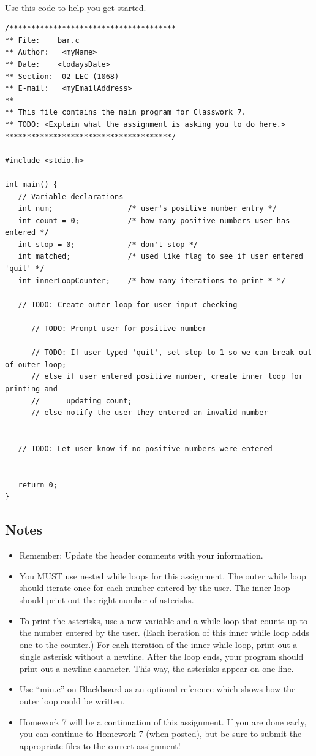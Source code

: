 \documentclass[letter,11pt]{article}
\begin{document}
\paragraph{}Use this code to help you get started.
\begin{verbatim}
/**************************************
** File:    bar.c
** Author:   <myName>
** Date:    <todaysDate>
** Section:  02-LEC (1068)
** E-mail:   <myEmailAddress>
**
** This file contains the main program for Classwork 7.
** TODO: <Explain what the assignment is asking you to do here.>
**************************************/

#include <stdio.h>

int main() {
   // Variable declarations
   int num;                 /* user's positive number entry */
   int count = 0;           /* how many positive numbers user has entered */
   int stop = 0;            /* don't stop */
   int matched;             /* used like flag to see if user entered 'quit' */
   int innerLoopCounter;    /* how many iterations to print * */

   // TODO: Create outer loop for user input checking

      // TODO: Prompt user for positive number

      // TODO: If user typed 'quit', set stop to 1 so we can break out of outer loop;
      // else if user entered positive number, create inner loop for printing and 
      //      updating count;
      // else notify the user they entered an invalid number


   // TODO: Let user know if no positive numbers were entered


   return 0;
}
\end{verbatim}

\subsection*{Notes}
\begin{itemize}
    \item Remember: Update the header comments with your information.
    \item You MUST use nested while loops for this assignment. The outer while loop should iterate once for each number entered by the user. The inner loop should print out the right number of asterisks.
    \item To print the asterisks, use a new variable and a while loop that counts up to the number entered by the user. (Each iteration of this inner while loop adds one to the counter.) For each iteration of the inner while loop, print out a single asterisk without a newline. After the loop ends, your program should print out a newline character. This way, the asterisks appear on one line.
    \item Use ``min.c'' on Blackboard as an optional reference which shows how the outer loop could be written.
    \item Homework 7 will be a continuation of this assignment. If you are done early, you can continue to Homework 7 (when posted), but be sure to submit the appropriate files to the correct assignment!
\end{itemize}
\end{document}
